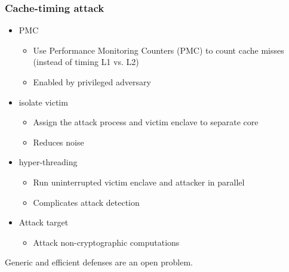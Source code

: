 \subsubsection{Cache-timing attack}
\begin{itemize}
  \item  PMC
    \begin{itemize}
      \item Use Performance Monitoring Counters (PMC) to count cache misses
	(instead of timing L1 vs. L2)
      \item Enabled by privileged adversary
    \end{itemize}
  \item  isolate victim
    \begin{itemize}
      \item Assign the attack process and victim enclave to separate core
      \item Reduces noise
    \end{itemize}
  \item  hyper-threading
    \begin{itemize}
      \item Run uninterrupted victim enclave and attacker in parallel
      \item Complicates attack detection
    \end{itemize}
  \item Attack target
    \begin{itemize}
      \item Attack non-cryptographic computations
    \end{itemize}
\end{itemize}
Generic and efficient defenses  are an open problem.
